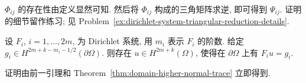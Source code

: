 $\Phi_{ij}$ 的存在性由定义显然可知. 然后将 $\Phi_{ij}$ 构成的三角矩阵求逆, 即可得到 $\Psi_{ij}$. 证明的细节留作练习; 见 Problem~\ref{ex:dirichlet-system-triangular-reduction-details}.

\begin{Corollary}
\label{cor:dirichlet-system-prescribed-traces}
设 $F_i$, $i=1,\ldots,2m$, 为 Dirichlet 系统, 用 $m_i$ 表示 $F_i$ 的阶数. 给定 $g_i\in H^{2m+k-m_i-1/2}(\partial\Omega)$. 则存在 $u\in H^{2m+k}(\Omega)$, 使得在 $\partial\Omega$ 上有 $F_iu=g_i$.
\end{Corollary}

证明由前一引理和 Theorem~\ref{thm:domain-higher-normal-trace} 立即得到.
